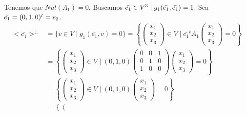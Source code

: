 \begin{ejercicio}
\begin{enumerate}
\begin{enumerate}
            Tenemos que $Nul(A_1)=0$. Buscamos $\Bar{e_1}\in V^3 \mid g_1(\Bar{e_1},\Bar{e_1})=1$. Sea $\Bar{e_1}=(0,1,0)^t=e_2$.
            \begin{equation*}\begin{split}
                <\bar{e_1}>^\perp &= \{v \in V \mid g_1(\bar{e_1},v) = 0\} 
                = \left\{ \left(\begin{array}{c}
                     x_1 \\ x_2 \\ x_3
                \end{array} \right) \in V \mid \bar{e_1}^t A_1
                \left(\begin{array}{c}
                     x_1 \\ x_2 \\ x_3
                \end{array} \right) = 0\right\} \\
                &= \left\{ \left(\begin{array}{c}
                     x_1 \\ x_2 \\ x_3
                \end{array} \right) \in V \mid (0,1,0)\left(\begin{array}{ccc}
                    0 & 0 & 1 \\
                    0 & 1 & 0 \\
                    1 & 0 & 0 \\
                \end{array} \right) 
                \left(\begin{array}{c}
                     x_1 \\ x_2 \\ x_3
                \end{array} \right) = 0\right\} \\
                &= \left\{ \left(\begin{array}{c}
                     x_1 \\ x_2 \\ x_3
                \end{array} \right) \in V \mid (0,1,0)
                \left(\begin{array}{c}
                     x_1 \\ x_2 \\ x_3
                \end{array} \right) = 0\right\} \\
                &= \left\{ \left(\begin{array}{c}

\end{array}
\end{split}
\end{equation*}
\end{enumerate}
\end{enumerate}
\end{ejercicio}
